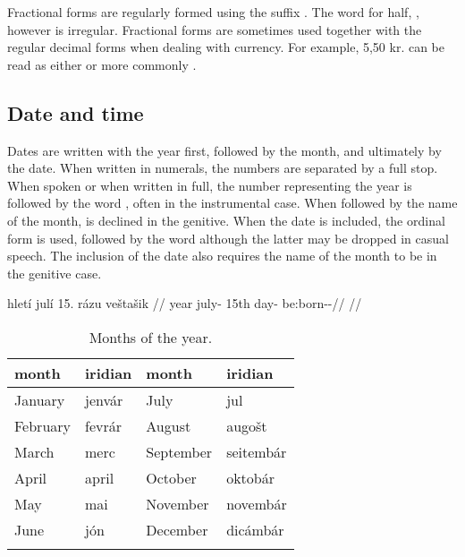 Fractional forms are regularly formed using the suffix . The word for half, , however is irregular. Fractional forms are sometimes used together with the regular decimal forms when dealing with currency. For example, 5,50 kr. can be read as either  or more commonly .

\subsection{Date and time}
Dates are written with the year first, followed by the month, and ultimately by the date. When written in numerals, the numbers are separated by a full stop. When spoken or when written in full, the number representing the year is followed by the word , often in the instrumental case. When followed by the name of the month,  is declined in the genitive. When the date is included, the ordinal form is used, followed by the word  although the latter may be dropped in casual speech. The inclusion of the date also requires the name of the month to be in the genitive case.

\pex
\a
\begingl
     hletí julí 15. rázu veštašik //
     year july-\Gen{} 15th day-\Ins{} be:born-\Av{}-\Pf{}//
    \glft {}//
\endgl
\xe

\begin{table}[h!]
	\caption{Months of the year.}
	\medskip
	\small
	\begin{tabu}to 0.7 \textwidth {YYYY}
		\toprule
		{\sc month} & {\sc iridian} & {\sc month} & {\sc iridian}\\
		\midrule
		January		& jenvár	& July & jul\\
		February	& fevrár 	& August & augošt\\
		March		& merc		& September & seitembár\\
		April		& april 	& October & oktobár\\
		May 		& mai 		& November & novembár\\
		June 		& jón 	& December & dicámbár\\
		\bottomrule
		\label{30992}
	\end{tabu}
\end{table}

